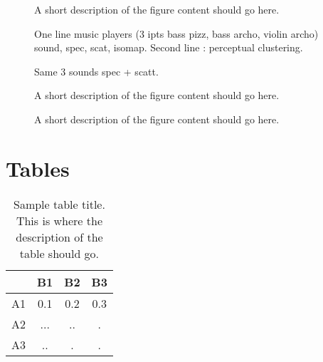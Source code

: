 \documentclass{bmcart}
\begin{document}
\begin{backmatter}
\begin{figure}[h!]
\caption{
A short description of the figure content should go here.}
\end{figure}

\begin{figure}[h!]
\caption{
One line music players (3 ipts bass pizz, bass archo, violin archo) sound, spec,
scat, isomap.
Second line : perceptual clustering.}
\end{figure}

\begin{figure}[h!]
\caption{
Same 3 sounds spec + scatt.}
\end{figure}

\begin{figure}[h!]
\caption{
A short description of the figure content should go here.}
\end{figure}

\begin{figure}[h!]
\caption{
A short description of the figure content should go here.}
\end{figure}


\section*{Tables}
\begin{table}[h!]
\caption{Sample table title. This is where the description of the table should go.}
      \begin{tabular}{cccc}
        \hline
           & B1  &B2   & B3\\ \hline
        A1 & 0.1 & 0.2 & 0.3\\
        A2 & ... & ..  & .\\
        A3 & ..  & .   & .\\ \hline
      \end{tabular}
\end{table}



\end{backmatter}
\end{document}
